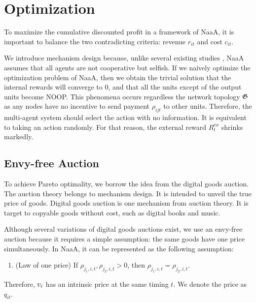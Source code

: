 \section{Optimization}
To maximize the cumulative discounted profit in a framework of NaaA,
it is important to balance the two contradicting criteria: revenue $r_{it}$ and cost $c_{it}$.



We introduce mechanism design because, unlike several existing studies \citep{sukhbaatar2016learning}, NaaA assumes that all agents are not cooperative but selfish.
If we naively optimize the optimization problem of NaaA, then we obtain the trivial solution that the internal rewards will converge to 0, and that all the units except of the output units become NOOP.
This phenomena occurs regardless the network topology $\mathfrak{G}$ as any nodes have no incentive to send payment $\rho_{ijt}$ to other units.
Therefore, the multi-agent system should select the action with no information. It is equivalent to taking an action randomly.
For that reason, the external reward $R_t^{\mathrm ex}$ shrinks markedly.

\subsection{Envy-free Auction}
To achieve Pareto optimality, we borrow the idea from the digital goods auction.
The auction theory belongs to mechanism design. It is intended to unveil the true price of goods.
Digital goods auction is one mechanism from auction theory.
It is target to copyable goods without cost, such as digital books and music.

Although several variations of digital goods auctions exist,
we use an envy-free auction \citep{guruswami2005profit} because it requires a simple assumption: the same goods have one price simultaneously.
In NaaA, it can be represented as the following assumption:
\begin{enumerate}
\renewcommand{\labelenumi}{N\arabic{enumi}:}
\setcounter{enumi}{4}
\item (Law of one price)
	If $\rho_{j_1,i,t}, \rho_{j_2,i,t} > 0$, then $\rho_{j_1,i,t} = \rho_{j_2,i,t}$.
\end{enumerate}
Therefore, $v_{i}$ has an intrinsic price at the same timing $t$.
We denote the price as $q_{it}$.

